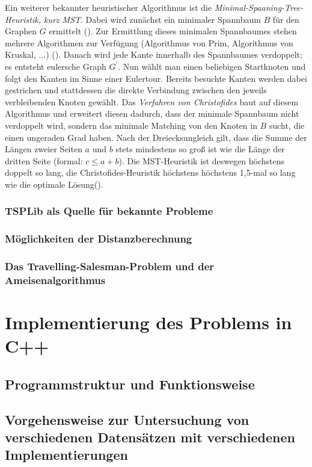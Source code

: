 \documentclass[doktyp=barbeit, sprache=german]{TUBAFarbeiten}
\begin{document}
Ein weiterer bekannter heuristischer Algorithmus ist die \textit{Minimal-Spaaning-Tree-Heuristik, kurz MST}. Dabei wird zunächst ein minimaler Spannbaum $B$ für den Graphen $G$ ermittelt (\cite{Groetschel2005}). Zur Ermittlung dieses minimalen Spannbaumes stehen mehrere Algorithmen zur Verfügung (Algorithmus von Prim, Algorithmus von Kruskal, ...) (\cite{MST}). Danach wird jede Kante innerhalb des Spannbaumes verdoppelt; es entsteht eulersche Graph $G^\prime$. Nun wählt man einen beliebigen Startknoten und folgt den Kanten im Sinne einer Eulertour. Bereits besuchte Kanten werden dabei gestrichen und stattdessen die direkte Verbindung zwischen den jeweils verbleibenden Knoten gewählt. Das \textit{Verfahren von Christofides} baut auf diesem Algorithmus und erweitert diesen dadurch, dass der minimale Spannbaum nicht verdoppelt wird, sondern das minimale Matching von den Knoten in $B$ sucht, die einen ungeraden Grad haben. Nach der Dreiecksungleich gilt, dass die Summe der Längen zweier Seiten $a$ und $b$ stets mindestens so groß ist wie die Länge der dritten Seite (formal: $c \leq a + b$). Die MST-Heuristik ist deswegen höchstens doppelt so lang, die Christofides-Heuristik höchstens höchstens 1,5-mal so lang wie die optimale Lösung(\cite{Groetschel2005}).
\subsubsection{TSPLib als Quelle für bekannte Probleme}
\subsubsection{Möglichkeiten der Distanzberechnung}
\subsubsection{Das Travelling-Salesman-Problem und der Ameisenalgorithmus}
\section{Implementierung des Problems in C++}
\subsection{Programmstruktur und Funktionsweise}
\subsection{Vorgehensweise zur Untersuchung von verschiedenen Datensätzen mit verschiedenen Implementierungen}
\end{document}
